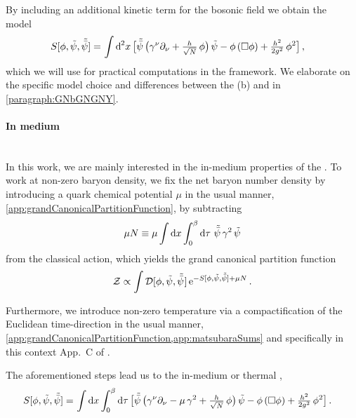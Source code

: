 By including an additional kinetic term for the bosonic field we obtain the  model~\cite{ZinnJustin:1991yn,ZinnJustin:2002ru,Rosa:2000ju}
\begin{align}
	S [ \phi ,\Fpsi,\Fpsib] = \, & \int \dif^{\,2}\! x \, \big[ \Fpsib \, \big( \gamma^\nu\partial_\nu + \tfrac{h}{\sqrt{N}} \, \phi \big) \, \Fpsi - \phi \, ( \Box \phi ) + \tfrac{h^2}{2 g^2} \, \phi^2 \big] \, ,		\label{eq:gny-model}
\end{align}
which we will use for practical computations in the \frg{} framework. We elaborate on the specific model choice and differences between the (b)\gn{} and \gnym{} in \cref{paragraph:GNbGNGNY}.

\paragraph{In medium}\label{paragraph:gnyTmu}\mbox{}\\%
In this work, we are mainly interested in the in-medium properties of the \gnym{}.
To work at non-zero baryon density, we fix the net baryon number density by introducing a quark chemical potential $\mu$ in the usual manner, \cf{} \cref{app:grandCanonicalPartitionFunction}, \viz{}
by subtracting
\begin{align}
	\mu N \equiv \mu \int\dif x \int_{0}^{\beta} \dif \tau \, \, \Fpsib \, \gamma^2 \, \Fpsi
\end{align}
from the classical \uv{} action, which yields the grand canonical partition function
\begin{align}
	\mathcal{Z} \propto \int \mathcal{D}[\phi,\tilde{\psi},\tilde{\bar{\psi}}\mskip1.0mu] \, \mathrm{e}^{- S [\phi,\tilde{\psi},\tilde{\bar{\psi}}] + \mu N } \, .	\label{eq:GNpartition_function}
\end{align}

Furthermore, we introduce non-zero temperature via a compactification of the Euclidean time-direction in the usual manner, \cf{} \cref{app:grandCanonicalPartitionFunction,app:matsubaraSums} and specifically in this context App.~C of .

The aforementioned steps lead us to the in-medium or thermal \gnym{},
\begin{align}
	S[\phi, \Fpsi,\Fpsib] = \, & \int\dif x \int_{0}^{\beta} \dif \tau \, \big[ \Fpsib \, \big( \gamma^\nu\partial_\nu - \mu \, \gamma^2 + \tfrac{h}{\sqrt{N}} \, \phi \big) \, \Fpsi - \phi \, ( \Box \phi ) + \tfrac{h^2}{2 g^2} \, \phi^2 \big] \, .\label{eq:thermal_gny_action}
\end{align}